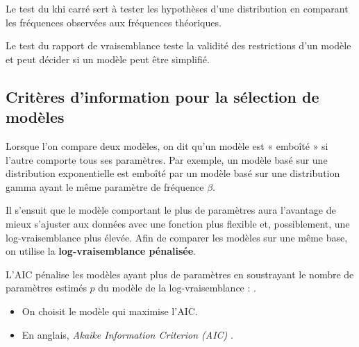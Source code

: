 \documentclass[french]{article}
\begin{document}
\begin{multicols*}{2}
Le test du khi carré sert à tester les hypothèses d'une distribution en comparant les fréquences observées aux fréquences théoriques.

\begin{definitionNOHFILLsub}

\end{definitionNOHFILLsub}

Le test du rapport de vraisemblance teste la validité des restrictions d'un modèle et peut décider si un modèle peut être simplifié.
\begin{definitionNOHFILLsub}

\end{definitionNOHFILLsub}

\subsection{Critères d'information pour la sélection de modèles}\label{subsec:ICModels}
Lorsque l'on compare deux modèles, on dit qu'un modèle est « \hypertarget{nestedModels}{emboîté} » si l'autre comporte tous ses paramètres. Par exemple, un modèle basé sur une distribution exponentielle est emboîté par un modèle basé sur une distribution gamma ayant le même paramètre de fréquence $\beta$. 

\bigskip

Il s'ensuit que le modèle comportant le plus de paramètres aura l'avantage de mieux s'ajuster aux données avec une fonction plus flexible et, possiblement, une log-vraisemblance plus élevée. Afin de comparer les modèles sur une même base, on utilise la \textbf{log-vraisemblance pénalisée}.

\begin{definitionNOHFILLsub}
L'AIC pénalise les modèles ayant plus de paramètres en soustrayant le nombre de paramètres estimés $p$ du modèle de la log-vraisemblance : .

\begin{itemize}
	\item	On choisit le modèle qui maximise l'AIC.
	\item	En anglais, \og \textit{Akaike Information Criterion (AIC)} \fg{}.
\end{itemize}
\end{definitionNOHFILLsub}



\end{multicols*}
\end{document}
